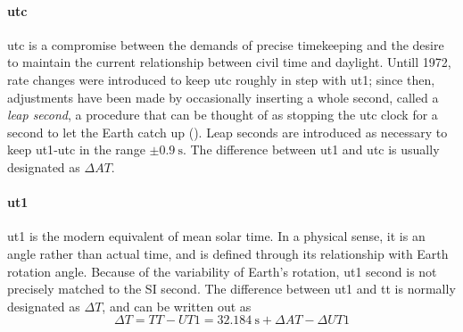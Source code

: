 \paragraph{\gls{utc}}\label{par:utc}
\gls{utc} is a compromise between the demands of precise timekeeping and the desire to maintain
the current relationship between civil time and daylight. Untill 1972, rate changes were 
introduced to keep \gls{utc} roughly in step with \gls{ut1}; since then, adjustments have been 
made by occasionally inserting a whole second, called a \emph{leap second}, a procedure 
that can be thought of as stopping the \gls{utc} clock for a second to let the Earth catch 
up (\cite{sofa2021ts}). Leap seconds are introduced as necessary to keep \gls{ut1}-\gls{utc} in the
range $\pm\SI{0.9}{\second}$. The difference between \gls{ut1} and \gls{utc} is usually 
designated as $\Delta AT$.

\paragraph{\gls{ut1}}\label{par:ut1}
\gls{ut1} is the modern equivalent of mean solar time. In a physical sense, it is an 
angle rather than actual time, and is defined through its relationship with Earth 
rotation angle. Because of the variability of Earth's rotation, \gls{ut1} second is not 
precisely matched to the SI second. The difference between \gls{ut1} and \gls{tt} 
is normally designated as $\Delta T$, and can be written out as
\begin{equation}
    \Delta T = TT - UT1 = \SI{32.184}{\second} + \Delta AT - \Delta UT1
\end{equation}

